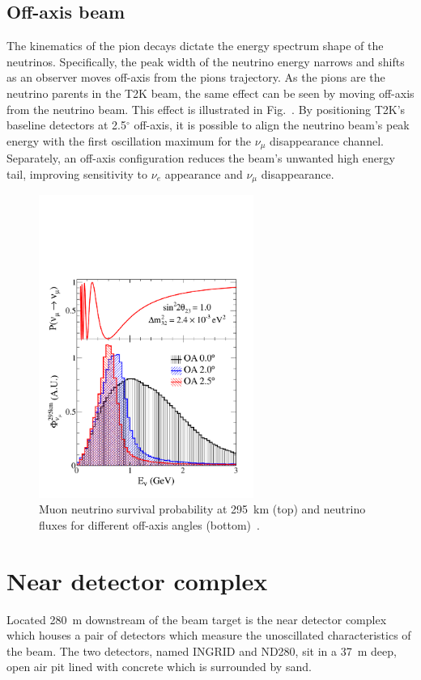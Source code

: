 \subsection{Off-axis beam}
\label{subsec:OffAxisBeam}
The kinematics of the pion decays dictate the energy spectrum shape of the neutrinos.  Specifically, the peak width of the neutrino energy narrows and shifts as an observer moves off-axis from the pions trajectory.  As the pions are the neutrino parents in the T2K beam, the same effect can be seen by moving off-axis from the neutrino beam.  This effect is illustrated in Fig.~\cite{fig:OAEffectFlux}.  By positioning T2K's baseline detectors at 2.5$^\circ$ off-axis, it is possible to align the neutrino beam's peak energy with the first oscillation maximum for the $\nu_\mu$ disappearance channel.  Separately, an off-axis configuration reduces the beam's unwanted high energy tail, improving sensitivity to $\nu_e$ appearance and $\nu_\mu$ disappearance.
\begin{figure}
  \centering
  \includegraphics[width=7cm]{images/t2k/oaeffect_flux.pdf}
  \caption{Muon neutrino survival probability at 295~km (top) and neutrino fluxes for different off-axis angles (bottom)~\cite{PhysRevD.87.012001}.}
  \label{fig:OAEffectFlux}
\end{figure}



\section{Near detector complex}
\label{sec:NearDetectorComplex}
Located 280~m downstream of the beam target is the near detector complex which houses a pair of detectors which measure the unoscillated characteristics of the beam.  The two detectors, named INGRID and ND280, sit in a 37~m deep, open air pit lined with concrete which is surrounded by sand.

